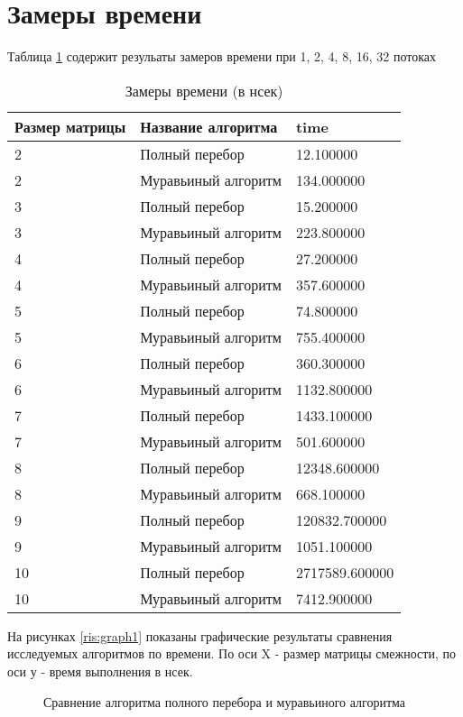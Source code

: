 \section{Замеры времени}\label{experimentgraph}

Таблица \ref{tab:resulttime} содержит резульаты замеров времени при 1, 2, 4, 8, 16, 32 потоках
\begin{table}[ht]
    \caption{Замеры времени (в нсек)}
    \centering
\begin{tabular}{ l | l | l}
    Размер матрицы&    Название алгоритма&         time\\ \hline
    2&   Полный перебор&    12.100000\\
    2&   Муравьиный алгоритм&   134.000000\\
    3&   Полный перебор&    15.200000\\
    3&   Муравьиный алгоритм&   223.800000\\
    4&   Полный перебор&    27.200000\\
    4&   Муравьиный алгоритм&   357.600000\\
    5&   Полный перебор&    74.800000\\
    5&   Муравьиный алгоритм&   755.400000\\
    6&   Полный перебор&   360.300000\\
    6&   Муравьиный алгоритм&  1132.800000\\
    7&   Полный перебор&  1433.100000\\
    7&   Муравьиный алгоритм&   501.600000\\
    8&   Полный перебор& 12348.600000\\
    8&   Муравьиный алгоритм&   668.100000\\
    9&   Полный перебор&120832.700000\\
    9&   Муравьиный алгоритм&  1051.100000\\
   10&   Полный перебор&2717589.600000\\
   10&   Муравьиный алгоритм&  7412.900000\\
\end{tabular}
\label{tab:resulttime}
\end{table}



На рисунках \ref{ris:graph1} показаны графические результаты сравнения исследуемых алгоритмов по времени. По оси X 
- размер матрицы смежности, по оси у - время выполнения в нсек.

\begin{figure}[H]
    \caption{Сравнение алгоритма полного перебора и муравьиного алгоритма}
    \label{ris:graph2}
\end{figure}

